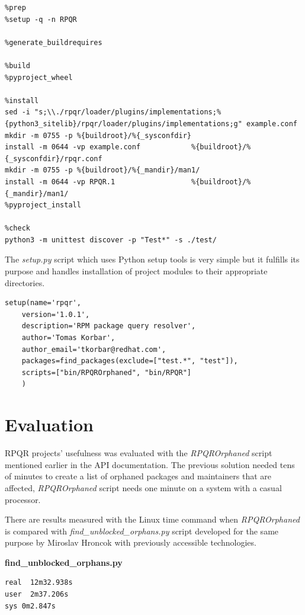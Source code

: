 \begin{lstlisting}
%prep
%setup -q -n RPQR

%generate_buildrequires

%build
%pyproject_wheel

%install
sed -i "s;\\./rpqr/loader/plugins/implementations;%{python3_sitelib}/rpqr/loader/plugins/implementations;g" example.conf
mkdir -m 0755 -p %{buildroot}/%{_sysconfdir}
install -m 0644 -vp example.conf            %{buildroot}/%{_sysconfdir}/rpqr.conf
mkdir -m 0755 -p %{buildroot}/%{_mandir}/man1/
install -m 0644 -vp RPQR.1                  %{buildroot}/%{_mandir}/man1/
%pyproject_install

%check
python3 -m unittest discover -p "Test*" -s ./test/
\end{lstlisting}

The \textit{setup.py} script which uses Python setup tools is very simple but it fulfills its purpose and
handles installation of project modules to their appropriate directories.

\begin{lstlisting}
setup(name='rpqr',
    version='1.0.1',
    description='RPM package query resolver',
    author='Tomas Korbar',
    author_email='tkorbar@redhat.com',
    packages=find_packages(exclude=["test.*", "test"]),
    scripts=["bin/RPQROrphaned", "bin/RPQR"]
    )
\end{lstlisting}

\section{Evaluation}

RPQR projects' usefulness was evaluated with the \textit{RPQROrphaned} script mentioned earlier in
the API documentation. The previous solution needed tens of minutes to create a list of orphaned packages
and maintainers that are affected, \textit{RPQROrphaned} script needs one minute on a system with a casual processor.

There are results measured with the Linux time command when \textit{RPQROrphaned} is compared with
\textit{find\_unblocked\_orphans.py}\cite{orphans}
script developed for the same purpose by Miroslav Hroncok with previously accessible technologies.

\textbf{find\_unblocked\_orphans.py}

\begin{lstlisting}
real  12m32.938s
user  2m37.206s
sys 0m2.847s  
\end{lstlisting}

